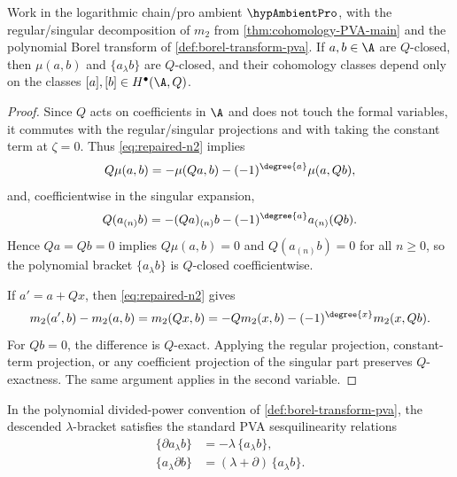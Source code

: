 \begin{lemma}
\label{lem:lambda_descends}
Work in the logarithmic chain/pro ambient $\hypAmbientPro$, with the
regular/singular decomposition of \(m_2\) from
\cref{thm:cohomology-PVA-main} and the polynomial Borel transform of
\cref{def:borel-transform-pva}. If \(a,b\in\A\) are \(Q\)-closed, then
\(\mu(a,b)\) and \(\{a_\lambda b\}\) are \(Q\)-closed, and their
cohomology classes depend only on the classes
\([a],[b]\in H^\bullet(\A,Q)\).
\end{lemma}

\begin{proof}
Since $Q$ acts on coefficients in $\A$ and does not touch the formal variables,
it commutes with the regular/singular projections and with taking the constant
term at $\zeta=0$. Thus \eqref{eq:repaired-n2} implies
\[
Q\mu(a,b)=-\mu(Qa,b)-(-1)^{\degree{a}}\mu(a,Qb),
\]
and, coefficientwise in the singular expansion,
\[
Q(a_{(n)}b)=-(Qa)_{(n)}b-(-1)^{\degree{a}}a_{(n)}(Qb).
\]
Hence $Qa=Qb=0$ implies $Q\mu(a,b)=0$ and $Q(a_{(n)}b)=0$ for all $n\ge0$, so the
polynomial bracket $\{a_\lambda b\}$ is $Q$-closed coefficientwise.

If $a'=a+Qx$, then \eqref{eq:repaired-n2} gives
\[
m_2(a',b)-m_2(a,b)
=
m_2(Qx,b)
=
-Qm_2(x,b)-(-1)^{\degree{x}}m_2(x,Qb).
\]
For $Qb=0$, the difference is $Q$-exact. Applying the regular projection, constant-term
projection, or any coefficient projection of the singular part preserves $Q$-exactness.
The same argument applies in the second variable.
\end{proof}

\begin{proposition}
\label{prop:PVA1_proof}
In the polynomial divided-power convention of
\cref{def:borel-transform-pva}, the descended $\lambda$-bracket
satisfies the standard PVA sesquilinearity relations
\begin{align}
\label{eq:repaired-PVA1a}
\{\partial a_\lambda b\} &= -\lambda\,\{a_\lambda b\},\\
\label{eq:repaired-PVA1b}
\{a_\lambda \partial b\} &= (\lambda+\partial)\,\{a_\lambda b\}.
\end{align}
\end{proposition}

